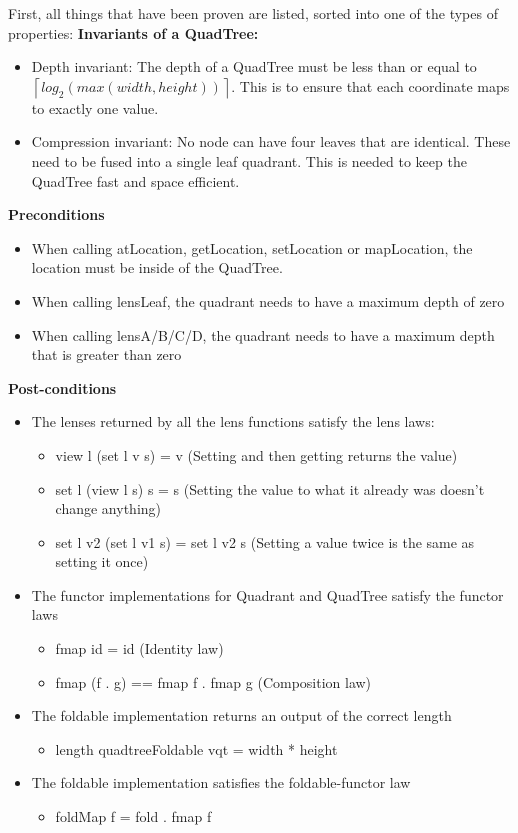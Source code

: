 First, all things that have been proven are listed, sorted into one of the types of properties: \linebreak 
\textbf{Invariants of a QuadTree:}
\begin{itemize}
    \item Depth invariant: The depth of a QuadTree must be less than or equal to $\left \lceil{log_{2}( max(width, height))}\right \rceil$. This is to ensure that each coordinate maps to exactly one value.
    \item Compression invariant: No node can have four leaves that are identical. These need to be fused into a single leaf quadrant. This is needed to keep the QuadTree fast and space efficient.
\end{itemize} 
\textbf{Preconditions}
\begin{itemize}
    \item When calling atLocation, getLocation, setLocation or mapLocation, the location must be inside of the QuadTree.
    \item When calling lensLeaf, the quadrant needs to have a maximum depth of zero
    \item When calling lensA/B/C/D, the quadrant needs to have a maximum depth that is greater than zero
\end{itemize} 
\textbf{Post-conditions}
\begin{itemize}
    \item The lenses returned by all the lens functions satisfy the lens laws: \cite{lens}
        \begin{itemize}
            \item view l (set l v s) = v (Setting and then getting returns the value)
            \item set l (view l s) s = s (Setting the value to what it already was doesn't change anything)
            \item set l v2 (set l v1 s) = set l v2 s (Setting a value twice is the same as setting it once)
        \end{itemize}
    \item The functor implementations for Quadrant and QuadTree satisfy the functor laws
        \begin{itemize}
            \item fmap id = id (Identity law)
            \item fmap (f . g) == fmap f . fmap g (Composition law)
        \end{itemize}
    \item The foldable implementation returns an output of the correct length
        \begin{itemize}
            \item length quadtreeFoldable vqt = width * height
        \end{itemize}
    \item The foldable implementation satisfies the foldable-functor law
        \begin{itemize}
            \item foldMap f = fold . fmap f
        \end{itemize}
\end{itemize}

